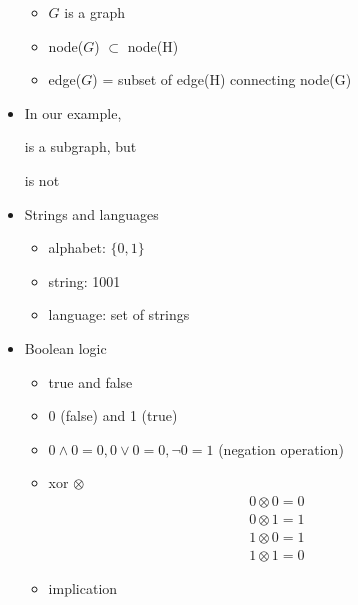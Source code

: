 \begin{frame}[allowframebreaks]
\begin{itemize}
\begin{itemize}
\item $G$ is a graph
\item node($G$) $\subset$ node(H)
\item edge($G$) = subset of edge(H) connecting node(G)
\end{itemize}
\item [] In our example,
  \begin{center}
\end{center}
is a subgraph, but
  \begin{center}
\end{center}
is not
\item Strings and languages
  \begin{itemize}
  \item alphabet: $\{0,1\}$
  \item string: 1001
  \item language: set of strings
  \end{itemize}
\item Boolean logic
  \begin{itemize}
  \item true and false
  \item 0 (false) and 1 (true)
  \item $0 \wedge 0 = 0, 0 \vee 0 = 0, \neg 0=1$ (negation operation)
  \item xor $\otimes$
    \begin{gather*}
      0 \otimes 0 = 0\\
0\otimes 1 = 1\\
1 \otimes 0 = 1\\
1\otimes 1 = 0
    \end{gather*}
  \item implication


\end{itemize}
\end{itemize}
\end{frame}
